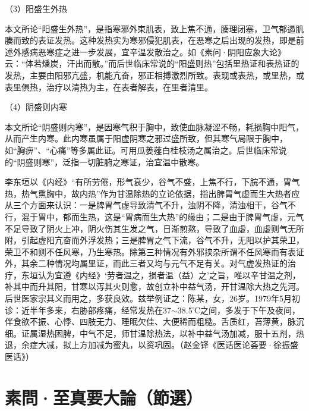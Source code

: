 \documentclass[draft,12pt]{ctexbook}
\begin{document}
（3）阳盛生外热

本文所论“阳盛生外热”，是指寒邪外束肌表，致上焦不通，腠理闭塞，卫气郁遏肌腠而致的表证发热。这种发热实为寒邪侵犯肌表，在恶寒之后出现的发热，即是前述外感病恶寒症之进一步发展，宜辛温发散治之。如《素问·阴阳应象大论》云：“体若燔炭，汗出而散。”而后世临床常说的“阳盛则热”包括里热证和表热证的发热，主要由阳邪亢盛，机能亢奋，邪正相搏激烈所致。表现或表热，或里热，或表里俱热，治疗以清热为主，在表者解表，在里者清里。

（4）阴盛则内寒

本文所论“阴盛则内寒”，是因寒气积于胸中，致使血脉凝涩不畅，耗损胸中阳气，从而产生内寒。此内寒虽属于阳虚阴寒之邪过盛所致，但其寒气局限于胸中，如“胸痹”、“心痛”等多属此证。可用瓜蒌薤白桂枝汤之属治之。后世临床常说的“阴盛则寒”，泛指一切脏腑之寒证，治宜温中散寒。



李东垣以《内经》“有所劳倦，形气衰少，谷气不盛，上焦不行，下脘不通，胃气热，热气熏胸中，故内热”作为甘温除热的立论依据，指出脾胃气虚而生大热者应从三个方面来认识：一是脾胃气虚导致清气不升，浊阴不降，清浊相干，谷气不行，混于胃中，郁而生热，这是“胃病而生大热”的缘由；二是由于脾胃气虚，元气不足导致了阴火上冲，阴火伤其生发之气，日渐煎熬，导致了血虚，血虚则气无所附，引起虚阳亢奋而外浮发热；三是脾胃之气下流，谷气不升，无阳以护其荣卫，荣卫不和则不任风寒，乃生寒热。除第三种情况有外邪挟杂所谓不任风寒而有表证外，其余二种情况均属里证，而此三者又均与元气不足有关。对气虚发热证的治疗，东垣认为宜遵《内经》‘劳者温之，损者温（益）之’之旨，唯以辛甘温之剂，补其中而升其阳，甘寒以泻其火则愈，故创立补中益气汤，开甘温除大热之先河。后世医家宗其义而用之，多获良效。兹举例证之：陈某，女，26岁。1979年5月初诊：近半年多来，右胁部疼痛，经常发热在37$\sim$38.5℃之间，多发于下午及夜间，伴食欲不振、心悸、四肢无力、睡眠欠佳、大便稀而粗糙。舌质红，苔薄黄，脉沉细。证属湿热困脾，中气不足，师甘温除热法，以补中益气汤加减，服十五剂，热退，余症大减，拟上方加减为蜜丸，以资巩固。（赵金铎《医话医论荟要·徐振盛医话》）

\section{素問·至真要大論（節選）}%

\end{document}
